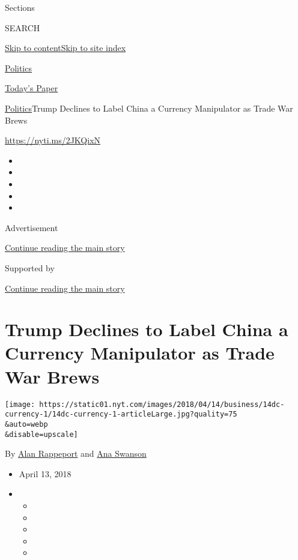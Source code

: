 Sections

SEARCH

\protect\hyperlink{site-content}{Skip to
content}\protect\hyperlink{site-index}{Skip to site index}

\href{https://www.nytimes.com/section/politics}{Politics}

\href{https://myaccount.nytimes.com/auth/login?response_type=cookie\&client_id=vi}{}

\href{https://www.nytimes.com/section/todayspaper}{Today's Paper}

\href{/section/politics}{Politics}\textbar{}Trump Declines to Label
China a Currency Manipulator as Trade War Brews

\url{https://nyti.ms/2JKQixN}

\begin{itemize}
\item
\item
\item
\item
\item
\end{itemize}

Advertisement

\protect\hyperlink{after-top}{Continue reading the main story}

Supported by

\protect\hyperlink{after-sponsor}{Continue reading the main story}

\hypertarget{trump-declines-to-label-china-a-currency-manipulator-as-trade-war-brews}{%
\section{Trump Declines to Label China a Currency Manipulator as Trade
War
Brews}\label{trump-declines-to-label-china-a-currency-manipulator-as-trade-war-brews}}

\texttt{[image: https://static01.nyt.com/images/2018/04/14/business/14dc-currency-1/14dc-currency-1-articleLarge.jpg?quality=75\\\&auto=webp\\\&disable=upscale]}

By \href{https://www.nytimes.com/by/alan-rappeport}{Alan Rappeport} and
\href{https://www.nytimes.com/by/ana-swanson}{Ana Swanson}

\begin{itemize}
\item
  April 13, 2018
\item
  \begin{itemize}
  \item
  \item
  \item
  \item
  \item
  \end{itemize}
\end{itemize}

